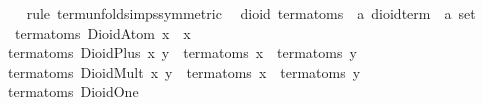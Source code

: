 \begin{isabellebody}
\ \ %
\endisadelimproof
%
\isatagproof
{}\isamarkupfalse%
\ {}rule\ term{}unfold{}simps{}{}{}{}symmetric{}{}%
\endisatagproof
{\isafoldproof}%
%
\isadelimproof
\isanewline
%
\endisadelimproof
\isanewline
{}\isamarkupfalse%
\ {}\ dioid{}\ term{}atoms\ {}{}\ {}{}a\ dioid{}term\ {}\ {}a\ set{}\ \isanewline
\ \ {}term{}atoms\ {}DioidAtom\ x{}\ {}\ {}x{}{}\isanewline
{}\ {}term{}atoms\ {}DioidPlus\ x\ y{}\ {}\ {}term{}atoms\ x{}\ {}\ {}term{}atoms\ y{}{}\isanewline
{}\ {}term{}atoms\ {}DioidMult\ x\ y{}\ {}\ {}term{}atoms\ x{}\ {}\ {}term{}atoms\ y{}{}\isanewline
{}\ {}term{}atoms\ DioidOne\ {}\ {}{}{}\isanewline

\end{isabellebody}
